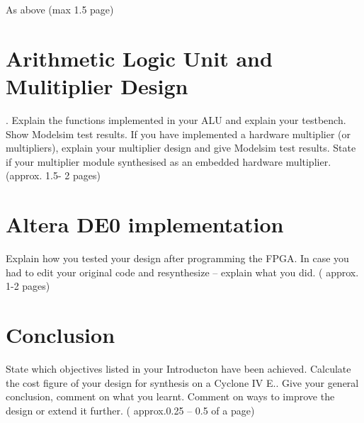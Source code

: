 

\review
{
	As above (max 1.5 page)
}

\section{Arithmetic Logic Unit and Mulitiplier Design} \label{sec:alu-design}.
\review
{
	 Explain the functions implemented in  your ALU and explain your testbench. Show Modelsim test results.  If you have implemented a hardware multiplier (or multipliers), explain your multiplier design and give Modelsim test results. State if your multiplier module synthesised as an embedded hardware multiplier.  (approx. 1.5- 2 pages)
}

\section{Altera DE0 implementation} \label{sec:implementation}
\review
{
	Explain how you tested your design after  programming the FPGA. In case you had to edit your original code and resynthesize – explain what you did.  ( approx. 1-2 pages)
}

\section{Conclusion}
\review
{
	State which objectives listed in your Introducton have been achieved. Calculate the cost figure of your design for synthesis on a Cyclone IV E.. Give your general  conclusion, comment on what you learnt.  Comment on ways to improve the design or extend it further.  ( approx.0.25 – 0.5 of a page)
}